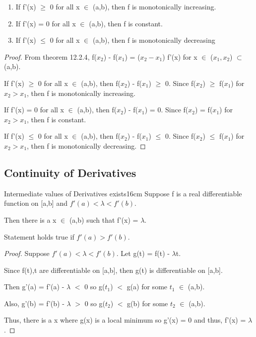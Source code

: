     \begin{enumerate}[label=(\alph*), leftmargin=2cm, itemsep=0.1cm]
        \item If f'(x) $\geq$ 0 for all x $\in$ (a,b), then f is monotonically
        increasing.

        \item If f'(x) = 0 for all x $\in$ (a,b), then f is constant.
        
        \item If f'(x) $\leq$ 0 for all x $\in$ (a,b), then f is monotonically
        decreasing
    \end{enumerate}

    \begin{proof}
        From {\color{red} theorem 12.2.4}, f($x_2$) - f($x_1$) = ($x_2 - x_1$) f'(x)
        for x $\in$ ($x_1,x_2$) $\subset$ (a,b).

        If f'(x) $\geq$ 0 for all x $\in$ (a,b), then f($x_2$) - f($x_1$) $\geq$ 0.
        Since f($x_2$) $\geq$ f($x_1$) for $x_2 > x_1$, then f is monotonically
        increasing.

        If f'(x) = 0 for all x $\in$ (a,b), then f($x_2$) - f($x_1$) = 0.
        Since f($x_2$) = f($x_1$) for $x_2 > x_1$, then f is constant.

        If f'(x) $\leq$ 0 for all x $\in$ (a,b), then f($x_2$) - f($x_1$) $\leq$ 0.
        Since f($x_2$) $\leq$ f($x_1$) for $x_2 > x_1$, then f is monotonically
        decreasing.
    \end{proof}

    \vspace{0.5cm}





\subsection{ Continuity of Derivatives }

    \begin{wtheorem}{Intermediate values of Derivatives exists}{16cm}
        Suppose f is a real differentiable function on [a,b]
        and $f'(a) < \lambda < f'(b)$.

        Then there is a x $\in$ (a,b) such that f'(x) = $\lambda$.

        Statement holds true if $f'(a) > f'(b)$.        
    \end{wtheorem}

    \begin{proof}
        Suppose $f'(a) < \lambda < f'(b)$.
        Let g(t) = f(t) - $\lambda$t.

        Since f(t),t are differentiable on [a,b],
        then g(t) is differentiable on [a,b].

        Then g'(a) = f'(a) - $\lambda$ $<$ 0 so g($t_1$) $<$ g(a)
        for some $t_1$ $\in$ (a,b).

        Also, g'(b) = f'(b) - $\lambda$ $>$ 0 so g($t_2$) $<$ g(b)
        for some $t_2$ $\in$ (a,b).

        Thus, there is a x where g(x) is a local minimum
        so g'(x) = 0 and thus, f'(x) = $\lambda$.
    \end{proof}

